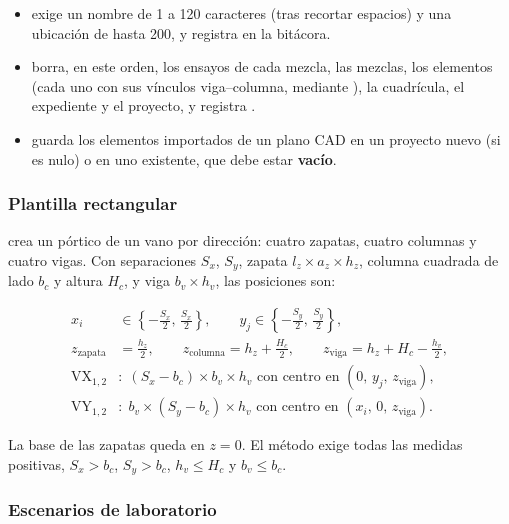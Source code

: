 \begin{itemize}
	\item {} exige un nombre de 1 a 120 caracteres (tras recortar
	      espacios) y una ubicación de hasta 200, y registra  en la bitácora.
	\item {} borra, en este orden, los ensayos de cada mezcla, las mezclas, los
	      elementos (cada uno con sus vínculos viga--columna, mediante ), la cuadrícula, el
	      expediente y el proyecto, y registra .
	\item {} guarda los elementos importados de un plano CAD en un
	      proyecto nuevo (si  es nulo) o en uno existente, que debe estar \textbf{vacío}.
\end{itemize}

\subsubsection{Plantilla rectangular}

 crea un pórtico de un vano por dirección: cuatro zapatas, cuatro
columnas y cuatro vigas. Con separaciones $S_x$, $S_y$, zapata $l_z \times a_z \times h_z$, columna cuadrada de lado
$b_c$ y altura $H_c$, y viga $b_v \times h_v$, las posiciones son:

\begin{align}
	x_i &\in \left\{-\tfrac{S_x}{2},\, \tfrac{S_x}{2}\right\}, \qquad y_j \in \left\{-\tfrac{S_y}{2},\, \tfrac{S_y}{2}\right\}, \\
	z_{\text{zapata}} &= \tfrac{h_z}{2}, \qquad z_{\text{columna}} = h_z + \tfrac{H_c}{2}, \qquad
	z_{\text{viga}} = h_z + H_c - \tfrac{h_v}{2}, \\
	\text{VX}_{1,2} &: \; (S_x - b_c) \times b_v \times h_v \text{ con centro en } (0,\, y_j,\, z_{\text{viga}}), \\
	\text{VY}_{1,2} &: \; b_v \times (S_y - b_c) \times h_v \text{ con centro en } (x_i,\, 0,\, z_{\text{viga}}).
\end{align}

La base de las zapatas queda en $z = 0$. El método exige todas las medidas positivas, $S_x > b_c$, $S_y > b_c$,
$h_v \le H_c$ y $b_v \le b_c$.

\subsubsection{Escenarios de laboratorio}

